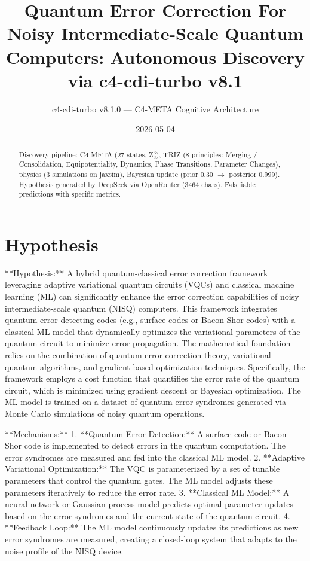 \documentclass[12pt]{article}
\title{Quantum Error Correction For Noisy Intermediate-Scale Quantum Computers: Autonomous Discovery via c4-cdi-turbo v8.1}
\author{c4-cdi-turbo v8.1.0 — C4-META Cognitive Architecture}
\date{2026-05-04}
\begin{document}
\maketitle
\begin{abstract}
Discovery pipeline: C4-META (27 states, Z$_3^3$), TRIZ (8 principles: Merging / Consolidation, Equipotentiality, Dynamics, Phase Transitions, Parameter Changes), 
physics (3 simulations on jaxsim), Bayesian update (prior 0.30 $\rightarrow$ posterior 0.999).
Hypothesis generated by DeepSeek via OpenRouter (3464 chars). 
Falsifiable predictions with specific metrics.
\end{abstract}
\section{Hypothesis}
**Hypothesis:**  
A hybrid quantum-classical error correction framework leveraging adaptive variational quantum circuits (VQCs) and classical machine learning (ML) can significantly enhance the error correction capabilities of noisy intermediate-scale quantum (NISQ) computers. This framework integrates quantum error-detecting codes (e.g., surface codes or Bacon-Shor codes) with a classical ML model that dynamically optimizes the variational parameters of the quantum circuit to minimize error propagation. The mathematical foundation relies on the combination of quantum error correction theory, variational quantum algorithms, and gradient-based optimization techniques. Specifically, the framework employs a cost function that quantifies the error rate of the quantum circuit, which is minimized using gradient descent or Bayesian optimization. The ML model is trained on a dataset of quantum error syndromes generated via Monte Carlo simulations of noisy quantum operations.  

**Mechanisms:**  
1. **Quantum Error Detection:** A surface code or Bacon-Shor code is implemented to detect errors in the quantum computation. The error syndromes are measured and fed into the classical ML model.  
2. **Adaptive Variational Optimization:** The VQC is parameterized by a set of tunable parameters that control the quantum gates. The ML model adjusts these parameters iteratively to reduce the error rate.  
3. **Classical ML Model:** A neural network or Gaussian process model predicts optimal parameter updates based on the error syndromes and the current state of the quantum circuit.  
4. **Feedback Loop:** The ML model continuously updates its predictions as new error syndromes are measured, creating a closed-loop system that adapts to the noise profile of the NISQ device.  
\end{document}
